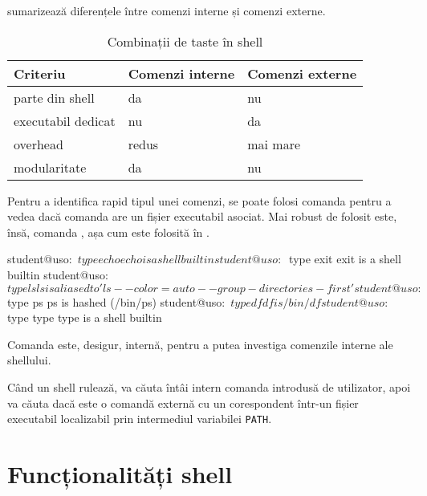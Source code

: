  sumarizează diferențele între comenzi interne și comenzi
externe.

\begin{table}[!htb]
  \caption{Combinații de taste în shell}
  \begin{center}
    \begin{tabular}{ p{} p{} p{} }
      \toprule
        \textbf{Criteriu} &
        \textbf{Comenzi interne} &
        \textbf{Comenzi externe} \\
      \midrule
        parte din shell &
        da &
        nu \\

        executabil dedicat &
        nu &
        da \\

        overhead &
        redus &
        mai mare \\

        modularitate &
        da &
        nu \\
      \bottomrule
    \end{tabular}
    \label{tab:cli:internal-vs-external}
  \end{center}
\end{table}

Pentru a identifica rapid tipul unei comenzi, se poate folosi comanda 
pentru a vedea dacă comanda are un fișier executabil asociat. Mai robust de
folosit este, însă, comanda , așa cum este folosită în .

\begin{screen}[caption={Tipul unei comenzi (type)},label={lst:cli:type}]
student@uso:~$ type echo
echo is a shell builtin
student@uso:~$ type exit
exit is a shell builtin
student@uso:~$ type ls
ls is aliased to 'ls --color=auto --group-directories-first'
student@uso:~$ type ps
ps is hashed (/bin/ps)
student@uso:~$ type df
df is /bin/df
student@uso:~$ type type
type is a shell builtin
\end{screen}

Comanda  este, desigur, internă, pentru a putea investiga comenzile interne
ale shellului.

Când un shell rulează, va căuta întâi intern comanda introdusă de utilizator,
apoi va căuta dacă este o comandă externă cu un corespondent într-un fișier
executabil localizabil prin intermediul variabilei \texttt{PATH}.

\section{Funcționalități shell}
\label{sec:cli:shell-func}

